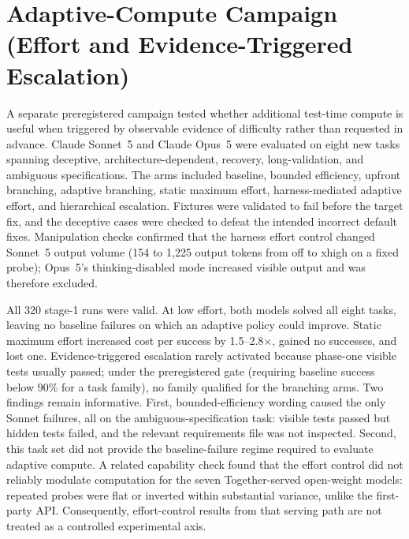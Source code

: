 \documentclass[11pt]{article}
\newcommand{\xd}{$\times$}
\begin{document}
\section{Adaptive-Compute Campaign (Effort and Evidence-Triggered Escalation)}
\label{app:adaptive}
A separate preregistered campaign tested whether additional test-time compute
is useful when triggered by observable evidence of difficulty rather than
requested in advance. Claude Sonnet~5 and Claude Opus~5 were evaluated on
eight new tasks spanning deceptive, architecture-dependent, recovery,
long-validation, and ambiguous specifications. The arms included baseline,
bounded efficiency, upfront branching, adaptive branching, static maximum
effort, harness-mediated adaptive effort, and hierarchical escalation.
Fixtures were validated to fail before the target fix, and the deceptive
cases were checked to defeat the intended incorrect default fixes. Manipulation checks
confirmed that the harness effort control changed Sonnet~5 output volume
(154 to 1{,}225 output tokens from off to xhigh on a fixed probe); Opus~5's
thinking-disabled mode increased visible output and was therefore excluded.

All 320 stage-1 runs were valid. At low effort, both models solved all eight
tasks, leaving no baseline failures on which an adaptive policy could improve.
Static maximum effort increased cost per success by 1.5--2.8\xd{}, gained no
successes, and lost one. Evidence-triggered escalation rarely activated
because phase-one visible tests usually passed; under the preregistered gate
(requiring baseline success below 90\% for a task family), no family
qualified for the branching arms. Two findings remain informative. First,
bounded-efficiency wording caused the only Sonnet failures, all on the
ambiguous-specification task: visible tests passed but hidden tests failed,
and the relevant requirements file was not inspected. Second, this task set
did not provide the baseline-failure regime required to evaluate adaptive
compute. A related capability check found that the effort control did not
reliably modulate computation for the seven Together-served open-weight
models: repeated probes were flat or inverted within substantial variance,
unlike the first-party API. Consequently, effort-control results from that
serving path are not treated as a controlled experimental axis.
\end{document}
